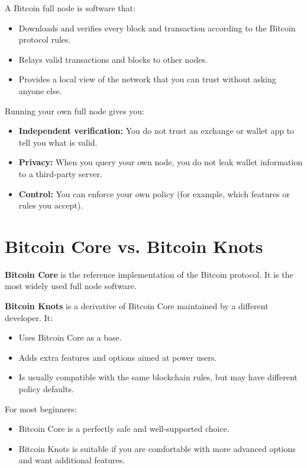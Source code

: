 \documentclass[12pt,a4paper]{book}
\begin{document}
A Bitcoin full node is software that:
\begin{itemize}
  \item Downloads and verifies every block and transaction according to the Bitcoin protocol rules.
  \item Relays valid transactions and blocks to other nodes.
  \item Provides a local view of the network that you can trust without asking anyone else.
\end{itemize}

Running your own full node gives you:
\begin{itemize}
  \item \textbf{Independent verification:} You do not trust an exchange or wallet app to tell you what is valid.
  \item \textbf{Privacy:} When you query your own node, you do not leak wallet information to a third-party server.
  \item \textbf{Control:} You can enforce your own policy (for example, which features or rules you accept).
\end{itemize}

\section{Bitcoin Core vs. Bitcoin Knots}

\textbf{Bitcoin Core} is the reference implementation of the Bitcoin protocol. It is the most widely used full node software.

\textbf{Bitcoin Knots} is a derivative of Bitcoin Core maintained by a different developer. It:
\begin{itemize}
  \item Uses Bitcoin Core as a base.
  \item Adds extra features and options aimed at power users.
  \item Is usually compatible with the same blockchain rules, but may have different policy defaults.
\end{itemize}

For most beginners:
\begin{itemize}
  \item Bitcoin Core is a perfectly safe and well-supported choice.
  \item Bitcoin Knots is suitable if you are comfortable with more advanced options and want additional features.
\end{itemize}
\end{document}
